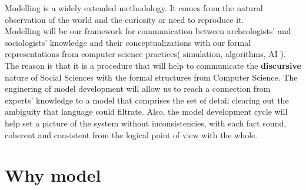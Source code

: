 \documentclass{report}
\begin{document}

Modelling is a widely extended methodology. It comes from the natural observation of the world and the curiosity or need to reproduce it.\\
Modelling will be our framework for communication between archeologists' and sociologists' knowledge and their conceptualizations with our formal representations from computer science practices( simulation, algorithms, AI ).
The reason is that it is a procedure that will help to communicate the \textbf{discursive} nature of Social Sciences with the formal structures from Computer Science. The enginering of model development will allow us to reach a connection from experts' knowledge to a model that comprises the set of detail clearing out the ambiguity that language could filtrate. Also, the model development cycle will help set a picture of the system without inconsistencies, with each fact sound,  coherent and consistent from the logical point of view with the whole. 

\section{Why model}
\end{document}
